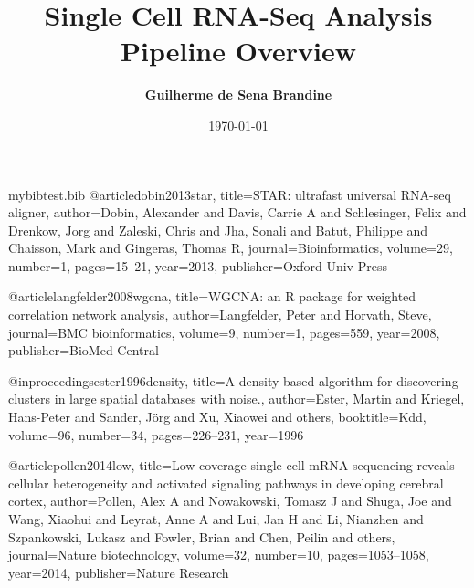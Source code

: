 \begin{filecontents}{mybibtest.bib}
@article{dobin2013star,
  title={STAR: ultrafast universal RNA-seq aligner},
  author={Dobin, Alexander and Davis, Carrie A and Schlesinger, Felix and Drenkow, Jorg and Zaleski, Chris and Jha, Sonali and Batut, Philippe and Chaisson, Mark and Gingeras, Thomas R},
  journal={Bioinformatics},
  volume={29},
  number={1},
  pages={15--21},
  year={2013},
  publisher={Oxford Univ Press}
}

@article{langfelder2008wgcna,
  title={WGCNA: an R package for weighted correlation network analysis},
  author={Langfelder, Peter and Horvath, Steve},
  journal={BMC bioinformatics},
  volume={9},
  number={1},
  pages={559},
  year={2008},
  publisher={BioMed Central}
}

@inproceedings{ester1996density,
  title={A density-based algorithm for discovering clusters in large spatial databases with noise.},
  author={Ester, Martin and Kriegel, Hans-Peter and Sander, J{\"o}rg and Xu, Xiaowei and others},
  booktitle={Kdd},
  volume={96},
  number={34},
  pages={226--231},
  year={1996}
}

@article{pollen2014low,
  title={Low-coverage single-cell mRNA sequencing reveals cellular heterogeneity and activated signaling pathways in developing cerebral cortex},
  author={Pollen, Alex A and Nowakowski, Tomasz J and Shuga, Joe and Wang, Xiaohui and Leyrat, Anne A and Lui, Jan H and Li, Nianzhen and Szpankowski, Lukasz and Fowler, Brian and Chen, Peilin and others},
  journal={Nature biotechnology},
  volume={32},
  number={10},
  pages={1053--1058},
  year={2014},
  publisher={Nature Research}
}

\end{filecontents}

\documentclass[11pt]{article}



\title{\bf Single Cell RNA-Seq Analysis Pipeline Overview}
\author{\bf Guilherme de Sena Brandine}
\usepackage{fullpage,
			times,
			amssymb, 
			graphicx, 
			caption,
			hyperref}
\usepackage[utf8]{inputenc}
\date{\today}

\newcommand{\prettyfig} [3]{
	\begin{figure}[h!]
	\centering
	\captionsetup{justification=centering}
	\texttt{[image: images/\#1]}
	\caption{\emph{#3}}
	\label{fig:#1}
	\end{figure}
}



\maketitle
\tableofcontents
\newpage

